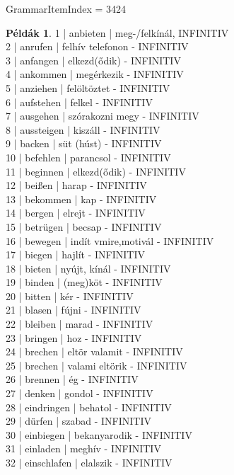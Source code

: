\documentclass{article}
\theoremstyle{definition}
\newtheorem*{exmp}{Példák}
\begin{document}
GrammarItemIndex = 3424

\begin{exmp}
1 | anbieten | meg-/felkínál, INFINITIV\\
2 | anrufen | felhív telefonon - INFINITIV\\
3 | anfangen | elkezd(ődik) - INFINITIV\\
4 | ankommen | megérkezik - INFINITIV\\
5 | anziehen | felöltöztet - INFINITIV\\
6 | aufstehen | felkel - INFINITIV\\
7 | ausgehen | szórakozni megy - INFINITIV\\
8 | aussteigen | kiszáll - INFINITIV\\
9 | backen | süt (húst) - INFINITIV\\
10 | befehlen | parancsol - INFINITIV\\
11 | beginnen | elkezd(ődik) - INFINITIV\\
12 | beißen | harap - INFINITIV\\
13 | bekommen | kap - INFINITIV\\
14 | bergen | elrejt - INFINITIV\\
15 | betrügen | becsap - INFINITIV\\
16 | bewegen | indít vmire,motivál - INFINITIV\\
17 | biegen | hajlít - INFINITIV\\
18 | bieten | nyújt, kínál - INFINITIV\\
19 | binden | (meg)köt - INFINITIV\\
20 | bitten | kér - INFINITIV\\
21 | blasen | fújni - INFINITIV\\
22 | bleiben | marad - INFINITIV\\
23 | bringen | hoz - INFINITIV\\
24 | brechen | eltör valamit - INFINITIV\\
25 | brechen | valami eltörik - INFINITIV\\
26 | brennen | ég - INFINITIV\\
27 | denken | gondol - INFINITIV\\
28 | eindringen | behatol - INFINITIV\\
29 | dürfen | szabad - INFINITIV\\
30 | einbiegen | bekanyarodik - INFINITIV\\
31 | einladen | meghív - INFINITIV\\
32 | einschlafen | elalszik - INFINITIV\\

\end{exmp}
\end{document}
